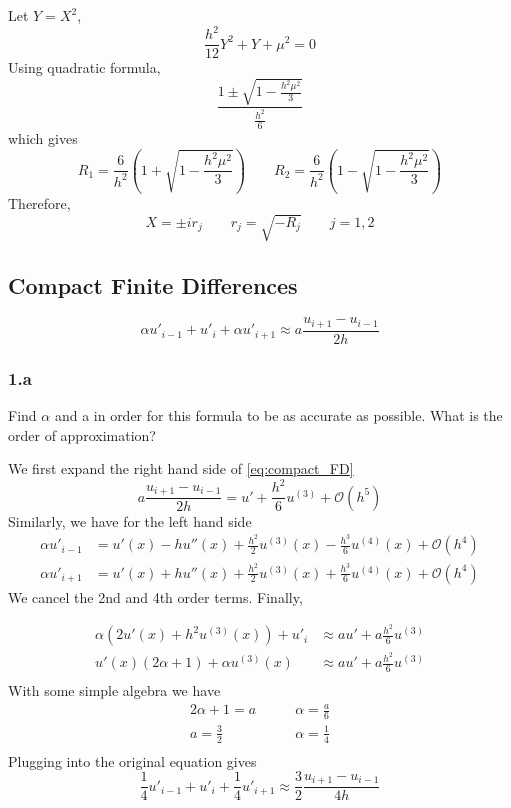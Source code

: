 Let $ Y = X^2 $, 
\[
\frac{ h^2 }{ 12 } Y^2 + Y + \mu^2 = 0 
\]
Using quadratic formula, 
\[
    \frac{ 1 \pm \sqrt{1 - \frac{ h^2\mu^2 }{ 3 }   }}{ \frac{ h^2 }{ 6 }  } 
\]
which gives 
\[
    R_1 = \frac{ 6 }{ h^2 } \left( 1 + \sqrt{1 - \frac{ h^2\mu^2 }{ 3 }   } \right) 
\qquad 
    R_2 = \frac{ 6 }{ h^2 } \left( 1 - \sqrt{1 - \frac{ h^2\mu^2 }{ 3 }   } \right) 
\]
Therefore, 
\[
    X = \pm ir_j \qquad r_j = \sqrt{-R_j} \qquad j = 1,2
\]


\subsection{Compact Finite Differences}
\label{subsec:Compact Finite Differences}
\begin{equation}
    \alpha u' _{i-1} + u'_i + \alpha u'_{i+1} \approx a \frac{ u_{i+1} - u_{i-1} }{ 2h } 
    \label{eq:compact_FD}
\end{equation}
\subsubsection{1.a}
Find $ \alpha  $ and a in order for this formula to be as accurate as possible. What is
the order of approximation? 

We first expand the right hand side of \ref{eq:compact_FD}  
\[
    a \frac{ u_{i+1} - u_{i-1} }{ 2h } = u' + \frac{ h^2  }{ 6 } u^{(3)} + \mathcal{ O  }
    \left( h^5 \right) 
\]
Similarly, we have for the left hand side
\begin{align*}
    \alpha u'_{i-1}  &= u'(x) -hu''(x) + \frac{ h^2 }{ 2 }  u _{  }^{ (3) } (x) - \frac{
    h^3 }{ 6 } u^{(4)} (x) + \mathcal{ O  } \left( h^4\right) \\
        \alpha u'_{i+1}  &= u'(x) + hu''(x) + \frac{ h^2 }{ 2 }  u _{  }^{ (3) } (x) + \frac{
    h^3 }{ 6 } u^{(4)} (x) + \mathcal{ O  } \left( h^4\right) 
\end{align*} 
We cancel the 2nd and 4th order terms.
Finally, 

\begin{align*}
    \alpha \left( 2u'(x) + h^2u^{(3)}(x) \right) + u'_i &\approx au' + a\frac{ h^2  }{ 6 } u^{(3)}\\
    u'(x)\left( 2\alpha + 1\right) + \alpha u^{(3)}(x) &\approx   au' + a\frac{ h^2  }{ 6 } u^{(3)}\\ 
\end{align*}
With some simple algebra we have 
\begin{align*}
    2\alpha + 1 = a &\qquad \alpha = \frac{ a }{ 6 }  \\
    a = \frac{ 3 }{ 2 }  &\qquad  \alpha = \frac{ 1 }{ 4 } \\
\end{align*}
Plugging into the original equation gives 
\[
    \frac{ 1 }{ 4 }  u' _{i-1} + u'_i + \frac{ 1 }{ 4 } u'_{i+1} \approx \frac{ 3 }{ 2 }
    \frac{ u_{i+1} - u_{i-1} }{ 4h } 
\]

